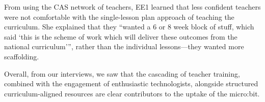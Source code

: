 From using the CAS network of teachers, EE1 learned that less confident teachers were not comfortable with the single-lesson plan approach of teaching the curriculum. She explained that they ``wanted a 6 or 8 week block of stuff, which said `this is the scheme of work which will deliver these outcomes from the national curriculum''', rather than the individual lessons---they wanted more scaffolding.

Overall, from our interviews, we saw that the cascading of teacher training, combined with the engagement of enthusiastic technologists, alongside structured curriculum-aligned resources are clear contributors to the uptake of the micro:bit.


